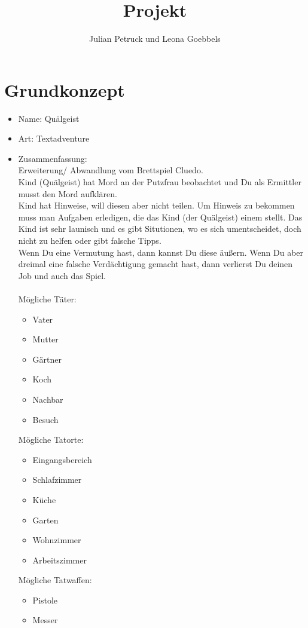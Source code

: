 \documentclass[10pt,a4paper]{article}
\title{Projekt}
\author{Julian Petruck und Leona Goebbels}
\begin{document}
\maketitle
\newcommand{\thetitle} {Projekt}

\section*{Grundkonzept}
\begin{itemize}
\item Name: Quälgeist
\item Art: Textadventure
\item Zusammenfassung:\\
Erweiterung/ Abwandlung vom Brettspiel Cluedo.\\
Kind (Quälgeist) hat Mord an der Putzfrau beobachtet und Du als Ermittler musst den Mord aufklären.\\
Kind hat Hinweise, will diesen aber nicht teilen. Um Hinweis zu bekommen muss man Aufgaben erledigen, die das Kind (der Quälgeist) einem stellt. Das Kind ist sehr launisch und es gibt Situtionen, wo es sich umentscheidet, doch nicht zu helfen oder gibt falsche Tipps.\\
Wenn Du eine Vermutung hast, dann kannst Du diese äußern. 
Wenn Du aber dreimal eine falsche Verdächtigung gemacht hast, dann verlierst Du deinen Job und auch das Spiel.\\
\ \\
Mögliche Täter:
\begin{itemize}
\item Vater
\item Mutter
\item Gärtner
\item Koch
\item Nachbar
\item Besuch
\end{itemize}
Mögliche Tatorte:
\begin{itemize}
\item Eingangsbereich
\item Schlafzimmer
\item Küche
\item Garten
\item Wohnzimmer
\item Arbeitszimmer
\end{itemize}
Mögliche Tatwaffen:
\begin{itemize}
\item Pistole
\item Messer

\end{itemize}
\end{itemize}
\end{document}

